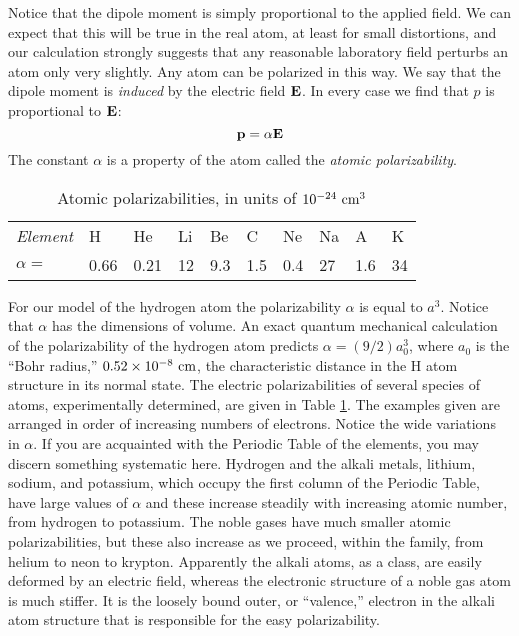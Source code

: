 Notice that the dipole moment is simply proportional to the applied
field. We can expect that this will be true in the real atom, at
least for small distortions, and our calculation strongly suggests that
any reasonable laboratory field perturbs an atom only very slightly.
Any atom can be polarized in this way. We say that the dipole
moment is \emph{induced}
by the electric field $\mathbf{E}$. In every case we find that
$p$ is proportional to $\mathbf{E}$:
\begin{equation}
  \mathbf{p} = \alpha\mathbf{E}
\end{equation}
The constant $\alpha$ is a property of the atom called the \emph{atomic
polarizability}.

\begin{table}[h] %
\caption{Atomic polarizabilities, in units of $10^{-24}\ \textup{cm}^3$}\label{table:polarizabilities}
\begin{tabular}{llllllllll}
\hline
\emph{Element} & H & He & Li & Be & C & Ne & Na & A & K \\
$\alpha=$      & 0.66 & 0.21 & 12 & 9.3 & 1.5 & 0.4 & 27 & 1.6 & 34 \\
\hline
\end{tabular}
\end{table}

For our model of the hydrogen atom the polarizability $\alpha$ is equal
to $a^3$. Notice that $\alpha$ has the dimensions of volume. An exact
quantum mechanical calculation of the polarizability of the hydrogen
atom predicts $\alpha = (9/2)a_0^3$, where $a_0$ is the ``Bohr radius,''
$0.52 \times 10^{-8}\ \cmunit$, the characteristic distance in the H atom structure
in its normal state. The electric polarizabilities of several species of
atoms, experimentally determined, are given in Table \ref{table:polarizabilities}. The 
examples given are arranged in order of increasing numbers of 
electrons. Notice the wide variations in $\alpha$. If you are acquainted with
the Periodic Table of the elements, you may discern something systematic
here. Hydrogen and the alkali metals, lithium, sodium, and
potassium, which occupy the first column of the Periodic Table, have
large values of $\alpha$ and these increase steadily with increasing atomic
number, from hydrogen to potassium. The noble gases have much
smaller atomic polarizabilities, but these also increase as we proceed,
within the family, from helium to neon to krypton. Apparently the
alkali atoms, as a class, are easily deformed by an electric field,
whereas the electronic structure of a noble gas atom is much stiffer.
It is the loosely bound outer, or ``valence,'' electron in the alkali atom
structure that is responsible for the easy polarizability.

